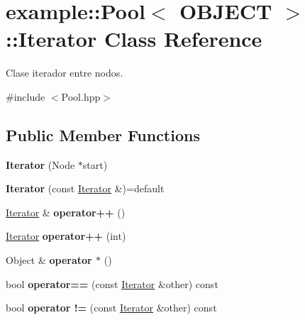 \hypertarget{classexample_1_1_pool_1_1_iterator}{}\section{example\+::Pool$<$ O\+B\+J\+E\+CT $>$\+::Iterator Class Reference}
\label{classexample_1_1_pool_1_1_iterator}


Clase iterador entre nodos.  




{\ttfamily \#include $<$Pool.\+hpp$>$}

\subsection*{Public Member Functions}
\begin{DoxyCompactItemize}
\item 
\mbox{\label{classexample_1_1_pool_1_1_iterator_a839b84c00674f70118a7427123a1b186}} 
{\bfseries Iterator} (Node $\ast$start)
\item 
\mbox{\label{classexample_1_1_pool_1_1_iterator_a2338e4802bdb5595972f0e6abd8c216a}} 
{\bfseries Iterator} (const \mbox{\hyperlink{classexample_1_1_pool_1_1_iterator}{Iterator}} \&)=default
\item 
\mbox{\label{classexample_1_1_pool_1_1_iterator_a6f2f9c68005cfc9c8ebd17168e752ffb}} 
\mbox{\hyperlink{classexample_1_1_pool_1_1_iterator}{Iterator}} \& {\bfseries operator++} ()
\item 
\mbox{\label{classexample_1_1_pool_1_1_iterator_a4ad18660a9e7813dd92fa77b753e460d}} 
\mbox{\hyperlink{classexample_1_1_pool_1_1_iterator}{Iterator}} {\bfseries operator++} (int)
\item 
\mbox{\label{classexample_1_1_pool_1_1_iterator_a6f5337ca3b402581696d64dd16067c4b}} 
Object \& {\bfseries operator $\ast$} ()
\item 
\mbox{\label{classexample_1_1_pool_1_1_iterator_a7607439be4ced7ef0621f9b870123607}} 
bool {\bfseries operator==} (const \mbox{\hyperlink{classexample_1_1_pool_1_1_iterator}{Iterator}} \&other) const
\item 
\mbox{\label{classexample_1_1_pool_1_1_iterator_a7def5370fdc837bcac345b9174e97cd3}} 
bool {\bfseries operator !=} (const \mbox{\hyperlink{classexample_1_1_pool_1_1_iterator}{Iterator}} \&other) const
\end{DoxyCompactItemize}



